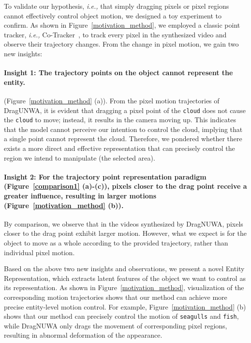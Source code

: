 \documentclass[runningheads]{llncs}
\def\ie{\emph{i.e.,}}
\newcommand{\ours}{\textup{DragAnything}\xspace}
\begin{document}
 To validate our hypothesis, \textit{i.e.,} that simply dragging pixels or pixel regions cannot effectively control object motion, we designed a toy experiment to confirm.
 As shown in Figure~\ref{motivation_method}, we employed a classic point tracker, \ie{} Co-Tracker~\cite{karaev2023cotracker}, to track every pixel in the synthesized video and observe their trajectory changes. 
From the change in pixel motion, we gain two new insights:

\paragraph{Insight 1: The trajectory points on the object cannot represent the entity.}
(Figure~\ref{motivation_method} (a)). 
%
%
From the pixel motion trajectories of DragUNWA, it is evident that dragging a pixel point of the \texttt{cloud} does not cause the \texttt{cloud} to move; instead, it results in the camera moving up.
%
This indicates that the model cannot perceive our intention to control the cloud, implying that a single point cannot represent the cloud.
%
Therefore, we pondered whether there exists a more direct and effective representation that can precisely control the region we intend to manipulate (the selected area).
%


\paragraph{Insight 2: For the trajectory point representation paradigm (Figure~\ref{comparison1} (a)-(c)), pixels closer to the drag point receive a greater influence, resulting in larger motions (Figure~\ref{motivation_method} (b)).} 
%
By comparison, we observe that in the videos synthesized by DragNUWA, pixels closer to the drag point exhibit larger motion.
%
However, what we expect is for the object to move as a whole according to the provided trajectory, rather than individual pixel motion.

Based on the above two new insights and observations, we present a novel Entity Representation, which extracts latent features of the object we want to control as its representation.
%
As shown in Figure~\ref{motivation_method}, visualization of the corresponding motion trajectories shows that our method can achieve more precise entity-level motion control.
%
For example, Figure~\ref{motivation_method} (b) shows that our method can precisely control the motion of \texttt{seagulls} and \texttt{fish}, while DragNUWA only drags the movement of corresponding pixel regions, resulting in abnormal deformation of the appearance.
%
%
\end{document}
